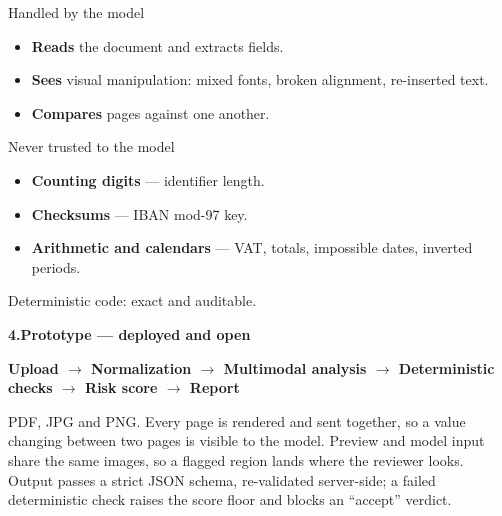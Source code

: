 \documentclass[10pt,a4paper]{article}
\newcommand{\heading}[2]{%
  \par\vspace{5pt}%
  {\color{navy}\bfseries #1\hspace{6pt}#2}%
  \par\vspace{-2pt}%
}
\begin{document}
\vspace{4pt}
\noindent
\begin{minipage}[t]{0.485\linewidth}
\begin{goodbox}{Handled by the model}
\begin{itemize}[leftmargin=14pt,itemsep=3pt,topsep=1pt,
                label=\textcolor{good}{\small$\checkmark$}]
  \item \textbf{Reads} the document and extracts fields.
  \item \textbf{Sees} visual manipulation: mixed fonts, broken alignment,
        re-inserted text.
  \item \textbf{Compares} pages against one another.
\end{itemize}
\end{goodbox}
\end{minipage}\hfill
\begin{minipage}[t]{0.485\linewidth}
\begin{badbox}{Never trusted to the model}
\begin{itemize}[leftmargin=14pt,itemsep=3pt,topsep=1pt,
                label=\textcolor{bad}{\small$\times$}]
  \item \textbf{Counting digits} --- identifier length.
  \item \textbf{Checksums} --- IBAN mod-97 key.
  \item \textbf{Arithmetic and calendars} --- VAT, totals, impossible dates,
        inverted periods.
\end{itemize}
\vspace{2pt}
{\footnotesize\color{muted}Deterministic code: exact and auditable.}
\end{badbox}
\end{minipage}

\heading{4.}{Prototype --- deployed and open}

{\footnotesize\color{steel}\bfseries
Upload $\rightarrow$ Normalization $\rightarrow$ Multimodal analysis
$\rightarrow$ Deterministic checks $\rightarrow$ Risk score $\rightarrow$ \mbox{Report}}

\vspace{3pt}
PDF, JPG and PNG. Every page is rendered and sent together, so a value changing
between two pages is visible to the model. Preview and model input share the
same images, so a flagged region lands where the reviewer looks. Output passes a
strict JSON schema, re-validated server-side; a failed deterministic check
raises the score floor and blocks an ``accept'' verdict.
\end{document}
